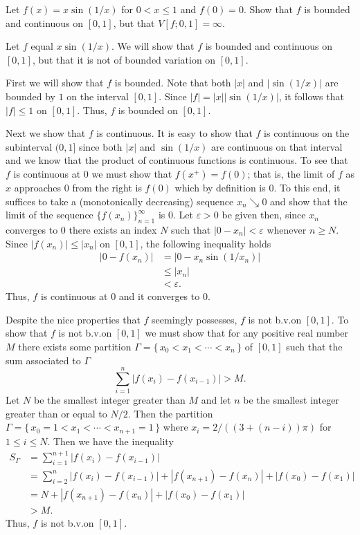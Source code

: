 \begin{problem}
  Let $f(x)=x\sin(1/x)$ for $0<x\leq 1$ and $f(0)=0$. Show that $f$ is
  bounded and continuous on $[0,1]$, but that $V[f;0,1]=\infty$.
\end{problem}
\begin{solution}
  Let $f$ equal $x\sin(1/x)$. We will show that $f$ is bounded and
  continuous on $[0,1]$, but that it is not of bounded variation on
  $[0,1]$.

  First we will show that $f$ is bounded. Note that both $|x|$ and
  $|\sin(1/x)|$ are bounded by $1$ on the interval $[0,1]$. Since
  $|f|=|x||\sin(1/x)|$, it follows that $|f|\leq 1$ on $[0,1]$. Thus, $f$
  is bounded on $[0,1]$.

  Next we show that $f$ is continuous. It is easy to show that $f$ is
  continuous on the subinterval $(0,1]$ since both $|x|$ and $\sin(1/x)$
  are continuous on that interval and we know that the product of
  continuous functions is continuous. To see that $f$ is continuous at $0$
  we must show that $f(x^+)=f(0)$; that is, the limit of $f$ as $x$
  approaches $0$ from the right is $f(0)$ which by definition is $0$. To
  this end, it suffices to take a (monotonically decreasing) sequence
  $x_n\searrow 0$ and show that the limit of the sequence
  ${\{f(x_n)\}}_{n=1}^\infty$ is $0$. Let $\varepsilon>0$ be given then,
  since $x_n$ converges to $0$ there exists an index $N$ such that
  $|0-x_n|<\varepsilon$ whenever $n\geq N$. Since $|f(x_n)|\leq |x_n|$ on
  $[0,1]$, the following inequality holds
  \begin{align*}
    |0-f(x_n)|
    &=\left|0-x_n\sin(1/x_n)\right|\\
    &\leq |x_n|\\
    &<\varepsilon.
  \end{align*}
  Thus, $f$ is continuous at $0$ and it converges to $0$.

  Despite the nice properties that $f$ seemingly possesses, $f$ is not
  b.v.\@ on $[0,1]$. To show that $f$ is not b.v.\@ on $[0,1]$ we must show
  that for any positive real number $M$ there exists some partition
  $\Gamma=\{\,x_0<x_1<\cdots<x_n\,\}$ of $[0,1]$ such that the sum
  associated to $\Gamma$
  \[
    \sum_{i=1}^n|f(x_i)-f(x_{i-1})|>M.
  \]
  Let $N$ be the smallest integer greater than $M$ and let $n$ be the
  smallest integer greater than or equal to $N/2$. Then the partition
  $\Gamma=\{\,x_0=1<x_1<\cdots<x_{n+1}=1\,\}$ where $x_i=2/((3+(n-i))\pi)$
  for $1\leq i\leq N$. Then we have the inequality
  \begin{align*}
    S_\Gamma
    &=\sum_{i=1}^{n+1}|f(x_i)-f(x_{i-1})|\\
    &=\sum_{i=2}^n
      |f(x_i)-f(x_{i-1})|+|f(x_{n+1})-f(x_n)|+|f(x_0)-f(x_1)|\\
    &=N+|f(x_{n+1})-f(x_n)|+|f(x_0)-f(x_1)|\\
    &>M.
  \end{align*}
  Thus, $f$ is not b.v.\@ on $[0,1]$.
\end{solution}

